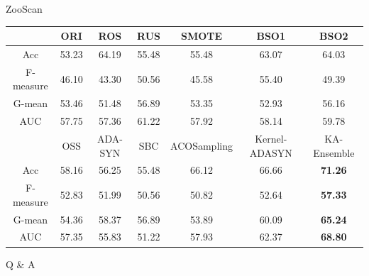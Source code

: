 \documentclass[10pt]{beamer}
\begin{document}
\begin{frame}{ZooScan}

\begin{table}[!h]
  	\centering
      \scriptsize
	\begin{tabular}{c|c|c|c|c|c|c}
    \toprule[1.5pt]
    \hline
    			&ORI	&ROS	&RUS	&SMOTE	&BSO1	&BSO2	\\ 
	\hline
    Acc			&53.23	&64.19	&55.48	&55.48	&63.07	&64.03	\\
    \hline
     F-measure	&46.10	&43.30	&50.56	&45.58	&55.40	&49.39\\
	\hline
    G-mean		&53.46	&51.48	&56.89	&53.35	&52.93	&56.16	\\
	\hline
    AUC			&57.75	&57.36	&61.22	&57.92	&58.14	&59.78\\

        \midrule[1.2pt]

                &OSS	&ADA-SYN	&SBC	&ACOSampling	&Kernel-ADASYN	&KA-Ensemble\\
	\hline
    Acc			&58.16	&56.25		&55.48	&66.12			&66.66			&\textbf{71.26}	\\
    \hline
     F-measure	&52.83	&51.99		&50.56	&50.82			&52.64			&\textbf{57.33}\\
	\hline
    G-mean		&54.36	&58.37		&56.89	&53.89			&60.09			&\textbf{65.24}	\\
	\hline
    AUC			&57.35	&55.83		&51.22	&57.93			&62.37			&\textbf{68.80}\\
    	\hline
\bottomrule[1.2pt]
    \end{tabular}
    \label{result4}    
\end{table}

\end{frame}


\begin{frame}
\centering\Huge\textsc{Q \& A}
\end{frame}
\end{document}
